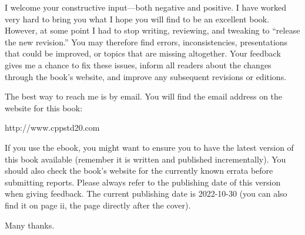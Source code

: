 I welcome your constructive input—both negative and positive. I have worked very hard to bring you what I hope you will find to be an excellent book. However, at some point I had to stop writing, reviewing, and tweaking to “release the new revision.” You may therefore find errors, inconsistencies, presentations that could be improved, or topics that are missing altogether. Your feedback gives me a chance to fix these issues, inform all readers about the changes through the book’s website, and improve any subsequent revisions or editions.

The best way to reach me is by email. You will find the email address on the website for this book:

http://www.cppstd20.com

If you use the ebook, you might want to ensure you to have the latest version of this book available (remember it is written and published incrementally). You should also check the book’s website for the currently known errata before submitting reports. Please always refer to the publishing date of this version when giving feedback. The current publishing date is 2022-10-30 (you can also find it on page ii, the page directly after the cover).

Many thanks.






